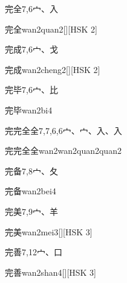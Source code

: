 \begin{entry}{完全}{7,6}{⼧、⼊}
  \begin{phonetics}{完全}{wan2quan2}[][HSK 2]
  \end{phonetics}
\end{entry}

\begin{entry}{完成}{7,6}{⼧、⼽}
  \begin{phonetics}{完成}{wan2cheng2}[][HSK 2]
  \end{phonetics}
\end{entry}

\begin{entry}{完毕}{7,6}{⼧、⽐}
  \begin{phonetics}{完毕}{wan2bi4}
  \end{phonetics}
\end{entry}

\begin{entry}{完完全全}{7,7,6,6}{⼧、⼧、⼊、⼊}
  \begin{phonetics}{完完全全}{wan2wan2quan2quan2}
  \end{phonetics}
\end{entry}

\begin{entry}{完备}{7,8}{⼧、⼡}
  \begin{phonetics}{完备}{wan2bei4}
  \end{phonetics}
\end{entry}

\begin{entry}{完美}{7,9}{⼧、⽺}
  \begin{phonetics}{完美}{wan2mei3}[][HSK 3]
  \end{phonetics}
\end{entry}

\begin{entry}{完善}{7,12}{⼧、⼝}
  \begin{phonetics}{完善}{wan2shan4}[][HSK 3]
  \end{phonetics}
\end{entry}

